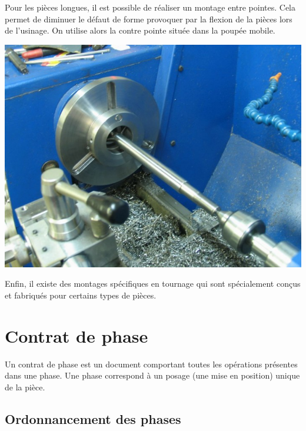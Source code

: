 \documentclass[11pt,oneside]{article}
\begin{document}
\begin{minipage}[c]{.4\linewidth}

Pour les pièces longues, il est possible de réaliser un montage entre pointes. Cela permet de diminuer le défaut de forme provoquer par la flexion de la pièces lors de l'usinage. On utilise alors la contre pointe située dans la poupée mobile. 

\end{minipage}\hfill
\begin{minipage}[c]{.48\linewidth}
\begin{center}
\includegraphics[width=.8\textwidth]{png/entre_pointes}
\end{center}
\end{minipage}

Enfin, il existe des montages spécifiques en tournage qui sont spécialement conçus et fabriqués pour certains types de pièces. 


\section{Contrat de phase}
\begin{defi}
Un contrat de phase est un document comportant toutes les opérations présentes dans une phase. Une phase correspond à un posage (une mise en position) unique de la pièce.
\end{defi}
\subsection{Ordonnancement des phases}
\end{document}
